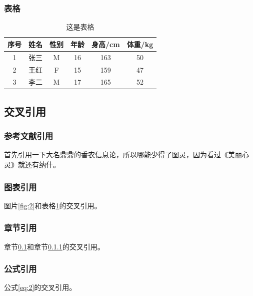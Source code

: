 \begin{ujnbody}
    \subsubsection{表格}
    \begin{table}[!htbp]
        \centering
        \caption{这是表格}
        \begin{tabular}{cccccc}
            \toprule
            序号 & 姓名 & 性别 & 年龄 & 身高/cm & 体重/kg \\
            \midrule
            1 & 张三 & M & 16 & 163 & 50 \\
            2 & 王红 & F & 15 & 159 & 47 \\
            3 & 李二 & M & 17 & 165 & 52 \\
            \bottomrule
        \end{tabular}
        \label{tab:2}
    \end{table}
    \subsection{交叉引用}\label{sec:3}
    \subsubsection{参考文献引用}\label{sec:4}
    首先引用一下大名鼎鼎的香农信息论\cite{shannon1948mathematical}，所以哪能少得了图灵\cite{turing2009computing}，因为看过《美丽心灵》就还有纳什\cite{nash1996non}。
    \subsubsection{图表引用}
    图片\ref{fig:2}和表格\ref{tab:2}的交叉引用。
    \subsubsection{章节引用}
    章节\ref{sec:3}和章节\ref{sec:4}的交叉引用。
    \subsubsection{公式引用}
    公式\ref{eq:2}的交叉引用。
\end{ujnbody}
